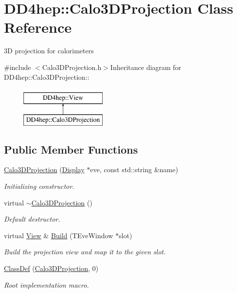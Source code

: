 \hypertarget{class_d_d4hep_1_1_calo3_d_projection}{
\section{DD4hep::Calo3DProjection Class Reference}
\label{class_d_d4hep_1_1_calo3_d_projection}
}


3D projection for calorimeters  


{\ttfamily \#include $<$Calo3DProjection.h$>$}Inheritance diagram for DD4hep::Calo3DProjection::\begin{figure}[H]
\begin{center}
\leavevmode
\includegraphics[height=2cm]{class_d_d4hep_1_1_calo3_d_projection}
\end{center}
\end{figure}
\subsection*{Public Member Functions}
\begin{DoxyCompactItemize}
\item 
\hyperlink{class_d_d4hep_1_1_calo3_d_projection_a919a663da0171fe6025081f6daa5cf23}{Calo3DProjection} (\hyperlink{class_d_d4hep_1_1_display}{Display} $\ast$eve, const std::string \&name)
\begin{DoxyCompactList}\small\item\em Initializing constructor. \item\end{DoxyCompactList}\item 
virtual \hyperlink{class_d_d4hep_1_1_calo3_d_projection_a21d41d0b38ff49b6e51f7d780a82351c}{$\sim$Calo3DProjection} ()
\begin{DoxyCompactList}\small\item\em Default destructor. \item\end{DoxyCompactList}\item 
virtual \hyperlink{class_d_d4hep_1_1_view}{View} \& \hyperlink{class_d_d4hep_1_1_calo3_d_projection_a2f0865f08b8eedfc84323b8a280d1216}{Build} (TEveWindow $\ast$slot)
\begin{DoxyCompactList}\small\item\em Build the projection view and map it to the given slot. \item\end{DoxyCompactList}\item 
\hyperlink{class_d_d4hep_1_1_calo3_d_projection_a4696a6c764ceaf1307e6459c24cd7d1f}{ClassDef} (\hyperlink{class_d_d4hep_1_1_calo3_d_projection}{Calo3DProjection}, 0)
\begin{DoxyCompactList}\small\item\em Root implementation macro. \item\end{DoxyCompactList}\end{DoxyCompactItemize}


